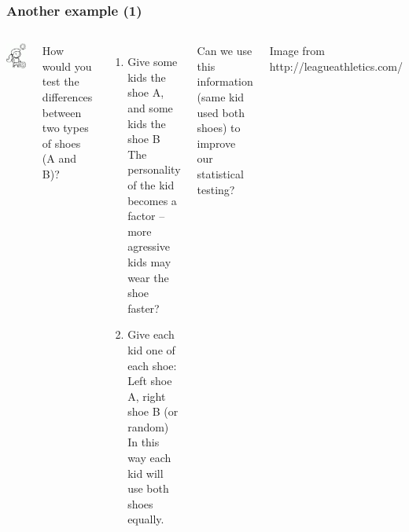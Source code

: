 \documentclass[10pt]{beamer}
\begin{document}
\begin{frame}
  \frametitle{Another example (1)}
  \begin{columns}[c]
    \includegraphics[width=1\textwidth]{img/soccer}
    \begin{block}{}
    How would you test the differences between two types of shoes (A and B)?
    \end{block}
    \begin{enumerate}
    \item<2> Give some kids the shoe A, and some kids the shoe B\\ 
      {\small The personality of the kid becomes a factor -- more agressive
      kids may wear the shoe faster?}
    \item<2> Give each kid one of each shoe: Left shoe A, right shoe B (or random)\\
      {\small In this way each kid will use both shoes equally.}
    \end{enumerate}
    \begin{block}{}
      Can we use this information (same kid used both shoes) to
      improve our statistical testing?
    \end{block}
    \vfill

    \hfill{\tiny Image from http://leagueathletics.com/}
  \end{columns}
\end{frame}
\end{document}
